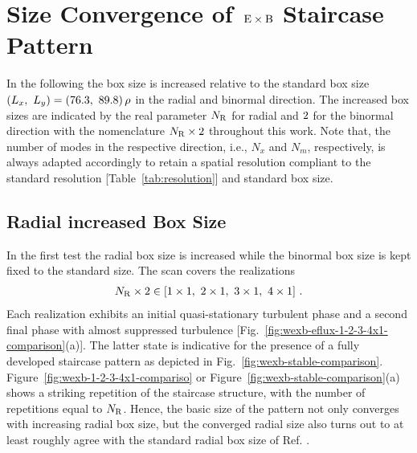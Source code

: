 
\newpage
\section{Size Convergence of $\mathrm{\:E}\times\mathrm{B}$ Staircase Pattern}
\label{sec:convergence}

In the following the box size is increased relative to the standard box size $(L_x,~L_y) = (76.3,~89.8)\,\rho$ in the radial and binormal direction. The increased box sizes are indicated by the real parameter $N_\mathrm{R}$ for radial and $2$ for the binormal direction with the nomenclature $N_\mathrm{R}\times 2$ throughout this work. 
Note that, the number of modes in the respective direction, i.e., $N_x$ and $N_m$, respectively, is always adapted accordingly to retain a spatial resolution compliant to the standard resolution [Table~\ref{tab:resolution}] and standard box size. \\

\subsection{Radial increased Box Size}
\label{sub:radial}

In the first test the radial box size is increased while the binormal box size is kept fixed to the standard size. The scan covers the realizations 
\begin{gather*}
	N_\mathrm{R} \times 2 \in [1\times1,~2\times1,~3\times1,~4\times1]~.
\end{gather*}
Each realization exhibits an initial quasi-stationary turbulent phase and a second final \cite{Peeters2016} phase with almost suppressed turbulence [Fig.~\ref{fig:wexb-eflux-1-2-3-4x1-comparison}(a)].
The latter state is indicative for the presence of a fully developed staircase pattern as depicted in Fig.~\ref{fig:wexb-stable-comparison}. 
Figure~\ref{fig:wexb-1-2-3-4x1-compariso} or Figure~\ref{fig:wexb-stable-comparison}(a) shows a striking repetition of the staircase structure, with the number of repetitions equal to $N_\mathrm{R}$.
Hence, the basic size of the pattern not only converges with increasing radial box size, but the converged radial size also turns out to at least roughly agree with the standard radial box size of Ref. . \bigskip

